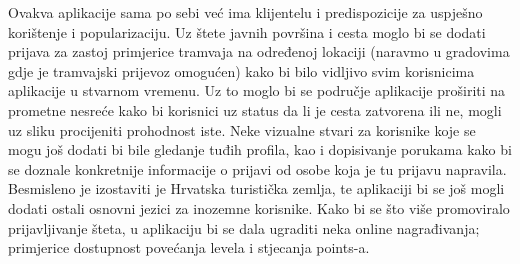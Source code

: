 		
		
		Ovakva aplikacije sama po sebi već ima klijentelu i predispozicije za uspješno korištenje i popularizaciju. Uz štete javnih površina i cesta moglo bi se dodati prijava za zastoj primjerice tramvaja na određenoj lokaciji (naravmo u gradovima gdje je tramvajski prijevoz omogućen) kako bi bilo vidljivo svim korisnicima aplikacije u stvarnom vremenu. Uz to moglo bi se područje aplikacije proširiti na prometne nesreće kako bi korisnici uz status da li je cesta zatvorena ili ne, mogli uz sliku procijeniti prohodnost iste. Neke vizualne stvari za korisnike koje se mogu još dodati bi bile gledanje tuđih profila, kao i dopisivanje porukama kako bi se doznale konkretnije informacije o prijavi od osobe koja je tu prijavu napravila. Besmisleno je izostaviti je Hrvatska turistička zemlja, te aplikaciji bi se još mogli dodati ostali osnovni jezici za inozemne korisnike. Kako bi se što više promoviralo prijavljivanje šteta, u aplikaciju bi se dala ugraditi neka online nagrađivanja; primjerice dostupnost povećanja levela i stjecanja points-a.